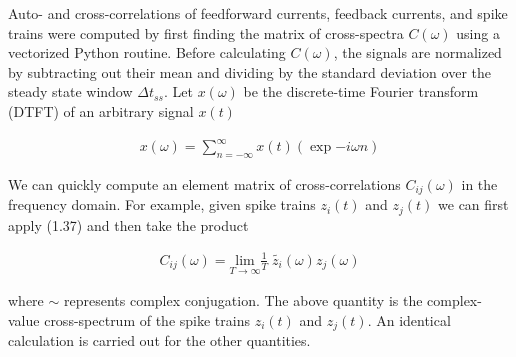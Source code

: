 \documentclass{ucetd}
\begin{document}
Auto- and cross-correlations of feedforward currents, feedback currents, and spike trains were computed by first finding the matrix of cross-spectra $C(\omega)$ using a vectorized Python routine. Before calculating $C(\omega)$, the signals are normalized by subtracting out their mean and dividing by the standard deviation over the steady state window $\Delta t_{ss}$. Let $x(\omega)$ be the discrete-time Fourier transform (DTFT) of an arbitrary signal $x(t)$

\begin{align}
x(\omega) = \sum_{n =-\infty}^{\infty}x(t)\left(\exp{-i\omega n}\right)
\end{align}

We can quickly compute an element matrix of cross-correlations $C_{ij}(\omega)$ in the frequency domain. For example, given spike trains $z_{i}(t)$ and $z_{j}(t)$ we can first apply (1.37) and then take the product

\begin{align}
C_{ij}(\omega) = \underset{T\rightarrow\infty}{\mathrm{lim}}\frac{1}{T}\;\tilde{z_{i}}(\omega)z_{j}(\omega)
\end{align}

where $\sim$ represents complex conjugation. The above quantity is the complex-value cross-spectrum of the spike trains $z_{i}(t)$ and $z_{j}(t)$. An identical calculation is carried out for the other quantities.
\end{document}
